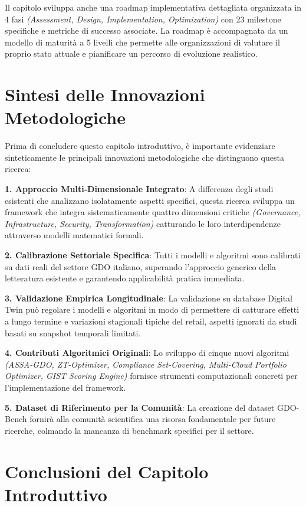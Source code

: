 Il capitolo sviluppa anche una roadmap implementativa dettagliata organizzata in 4 fasi \emph{(Assessment, Design, Implementation, Optimization)} con 23 milestone specifiche e metriche di successo associate. La roadmap è accompagnata da un modello di maturità a 5 livelli che permette alle organizzazioni di valutare il proprio stato attuale e pianificare un percorso di evoluzione realistico.

\section{Sintesi delle Innovazioni Metodologiche}

Prima di concludere questo capitolo introduttivo, è importante evidenziare sinteticamente le principali innovazioni metodologiche che distinguono questa ricerca:

\textbf{1. Approccio Multi-Dimensionale Integrato}: A differenza degli studi esistenti che analizzano isolatamente aspetti specifici, questa ricerca sviluppa un framework che integra sistematicamente quattro dimensioni critiche \emph{(Governance, Infrastructure, Security, Transformation)} catturando le loro interdipendenze attraverso modelli matematici formali.

\textbf{2. Calibrazione Settoriale Specifica}: Tutti i modelli e algoritmi sono calibrati su dati reali del settore GDO italiano, superando l'approccio generico della letteratura esistente e garantendo applicabilità pratica immediata.

\textbf{3. Validazione Empirica Longitudinale}: La validazione su database Digital Twin può regolare i modelli e algoritmi in modo di permettere di catturare effetti a lungo termine e variazioni stagionali tipiche del retail, aspetti ignorati da studi basati su snapshot temporali limitati.

\textbf{4. Contributi Algoritmici Originali}: Lo sviluppo di cinque nuovi algoritmi \emph{(ASSA-GDO, ZT-Optimizer, Compliance Set-Covering, Multi-Cloud Portfolio Optimizer, GIST Scoring Engine)} fornisce strumenti computazionali concreti per l'implementazione del framework.

\textbf{5. Dataset di Riferimento per la Comunità}: La creazione del dataset GDO-Bench fornirà alla comunità scientifica una risorsa fondamentale per future ricerche, colmando la mancanza di benchmark specifici per il settore.

\section{Conclusioni del Capitolo Introduttivo}


